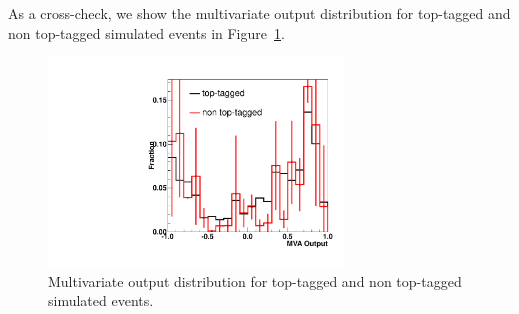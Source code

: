 As a cross-check, we show the multivariate output distribution for top-tagged and non 
top-tagged simulated events in Figure~\ref{fig:mva_top}.

\begin{figure}[!htbp]
\begin{center}
\includegraphics[width=0.7\textwidth]{figures/mva_top.pdf}
\caption{Multivariate output distribution for top-tagged and non top-tagged simulated events.}
\label{fig:mva_top}
\end{center}
\end{figure}



 
